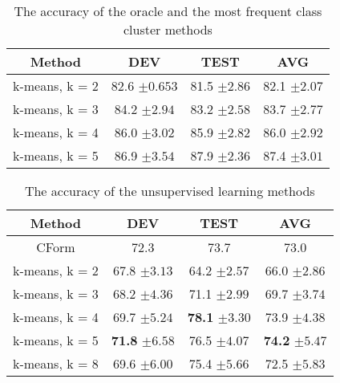 \documentclass[11pt]{article}
\begin{document}
\begin{table*}
\centering
\begin{tabular}{|c|c|c|c|} \hline
Method & DEV & TEST & AVG \\ \hline
k-means, k = 2 & 82.6 $\pm{0.653}$ & 81.5 $\pm{2.86}$ & 82.1 $\pm{2.07}$ \\ \hline
k-means, k = 3 & 84.2 $\pm{2.94}$ & 83.2 $\pm{2.58}$ & 83.7 $\pm{2.77}$  \\ \hline
k-means, k = 4 & 86.0 $\pm{3.02}$ & 85.9 $\pm{2.82}$ & 86.0 $\pm{2.92}$ \\ \hline
k-means, k = 5 & 86.9 $\pm{3.54}$ & 87.9 $\pm{2.36}$ & 87.4 $\pm{3.01}$\\ \hline
\end{tabular}
\caption{The accuracy of the oracle and the most frequent class cluster methods}
\end{table*}

\begin{table*}
\centering
\begin{tabular}{|c|c|c|c|} \hline
Method & DEV & TEST & AVG \\ \hline
CForm & 72.3 & 73.7 & 73.0 \\ \hline
k-means, k = 2 & 67.8 $\pm{3.13}$ & 64.2 $\pm{2.57}$ & 66.0 $\pm{2.86}$ \\ \hline
k-means, k = 3 & 68.2 $\pm{4.36}$ & 71.1 $\pm{2.99}$ & 69.7 $\pm{3.74}$ \\ \hline
k-means, k = 4 & 69.7 $\pm{5.24}$ & \textbf{78.1} $\pm{3.30}$ & 73.9 $\pm{4.38}$ \\ \hline
k-means, k = 5 & \textbf{71.8} $\pm{6.58}$ & 76.5 $\pm{4.07}$ & \textbf{74.2} $\pm{5.47}$ \\ \hline
k-means, k = 8 & 69.6 $\pm{6.00}$ & 75.4 $\pm{5.66}$ & 72.5 $\pm{5.83}$ \\ \hline
\end{tabular}
\caption{The accuracy of the unsupervised learning methods}
\end{table*}
\end{document}
